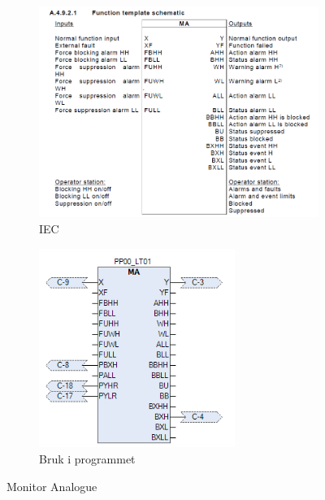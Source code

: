 \begin{figure}[htbp]
    \centering
    \begin{subfigure}[b]{0.45\textwidth}
        \centering
        \includegraphics[width=1\textwidth]{Bilder/MABlokkIEC.png}
        \caption{IEC}\label{fig:Monitor Analogue blokk IEC}
    \end{subfigure}
    \hfill
    \begin{subfigure}[b]{0.45\textwidth}
        \centering
        \includegraphics[width=0.7\textwidth]{Bilder/MABlokkIProgrammet.png}
        \caption{Bruk i programmet}\label{fig:Monitor Analogue blokk i programmet}
    \end{subfigure}
    \caption{Monitor Analogue}\label{fig:Monitor Analogue}
\end{figure}

